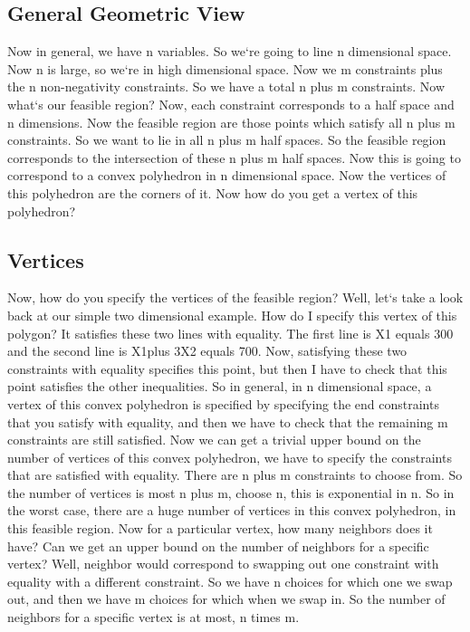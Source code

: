\subsection{General Geometric View}
Now in general, we have n variables.
So we`re going to line n dimensional space.
Now n is large, so we`re in high dimensional space.
Now we m constraints plus the n non-negativity constraints.
So we have a total n plus m constraints.
Now what`s our feasible region? Now, each constraint corresponds to a half space and n dimensions.
Now the feasible region are those points which satisfy all n plus m constraints.
So we want to lie in all n plus m half spaces.
So the feasible region corresponds to the intersection of these n plus m half spaces.
Now this is going to correspond to a convex polyhedron in n dimensional space.
Now the vertices of this polyhedron are the corners of it.
Now how do you get a vertex of this polyhedron?

\subsection{Vertices}
Now, how do you specify the vertices of the feasible region? Well, let`s take a look back at our simple two dimensional example.
How do I specify this vertex of this polygon? It satisfies these two lines with equality.
The first line is X1 equals 300 and the second line is X1plus 3X2 equals 700.
Now, satisfying these two constraints with equality specifies this point, but then I have to check that this point satisfies the other inequalities.
So in general, in n dimensional space, a vertex of this convex polyhedron is specified by specifying the end constraints that you satisfy with equality, and then we have to check that the remaining m constraints are still satisfied.
Now we can get a trivial upper bound on the number of vertices of this convex polyhedron, we have to specify the constraints that are satisfied with equality.
There are n plus m constraints to choose from.
So the number of vertices is most n plus m, choose n, this is exponential in n.
So in the worst case, there are a huge number of vertices in this convex polyhedron, in this feasible region.
Now for a particular vertex, how many neighbors does it have? Can we get an upper bound on the number of neighbors for a specific vertex? Well, neighbor would correspond to swapping out one constraint with equality with a different constraint.
So we have n choices for which one we swap out, and then we have m choices for which when we swap in.
So the number of neighbors for a specific vertex is at most, n times m.

